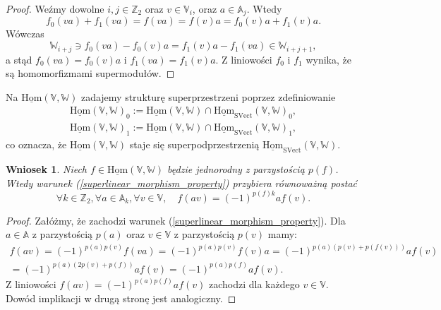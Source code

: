 \documentclass[11pt,a4paper]{report}
\newtheorem{corollary}[theorem]{Wniosek}
\theoremstyle{definition}
\begin{document}
\begin{proof}
	Weźmy dowolne $i,j \in \mathbb{Z}_2$ oraz $v \in \mathbb{V}_i$, oraz $a \in \mathbb{A}_j$. Wtedy
	\begin{equation*}
		f_0 (va) + f_1 (va) = f(va) = f(v)a = f_0(v)a + f_1(v)a.
	\end{equation*}
	Wówczas
	\begin{equation*}
		\mathbb{W}_{i+j} \ni f_0 (va) - f_0(v)a = f_1(v)a - f_1 (va) \in \mathbb{W}_{i+j+1},
	\end{equation*}
	a stąd $f_0 (va)=f_0(v)a$ i $f_1 (va)=f_1(v)a$. Z liniowości $f_0$ i $f_1$ wynika, że są homomorfizmami supermodułów. 
\end{proof}
Na $\underline{\mathrm{Hom}}(\mathbb{V},\mathbb{W})$ zadajemy strukturę superprzestrzeni poprzez zdefiniowanie
\begin{equation*}
	\begin{gathered}
		\underline{\mathrm{Hom}}(\mathbb{V},\mathbb{W})_0 := \underline{\mathrm{Hom}}(\mathbb{V},\mathbb{W}) \cap \underline{\mathrm{Hom}}_{\mathrm{SVect}}(\mathbb{V},\mathbb{W})_0, \\
		\underline{\mathrm{Hom}}(\mathbb{V},\mathbb{W})_1 := \underline{\mathrm{Hom}}(\mathbb{V},\mathbb{W}) \cap \underline{\mathrm{Hom}}_{\mathrm{SVect}}(\mathbb{V},\mathbb{W})_1,
	\end{gathered}
\end{equation*}
co oznacza, że $\underline{\mathrm{Hom}}(\mathbb{V},\mathbb{W})$ staje się superpodprzestrzenią $\underline{\mathrm{Hom}}_{\mathrm{SVect}}(\mathbb{V},\mathbb{W})$. 

\begin{corollary}
	Niech $f \in \underline{\mathrm{Hom}}(\mathbb{V},\mathbb{W})$ będzie jednorodny z parzystością $p(f)$. Wtedy warunek (\ref{superlinear_morphism_property}) przybiera równoważną postać
	\begin{equation}
		\forall k \in \mathbb{Z}_2, \forall a \in \mathbb{A}_k, \forall v \in \mathbb{V}, \quad f(av) = (-1)^{p(f)k} af(v).
	\end{equation}
\end{corollary}
\begin{proof}
	Załóżmy, że zachodzi warunek (\ref{superlinear_morphism_property}). Dla $a \in \mathbb{A}$ z parzystością $p(a)$ oraz $v \in \mathbb{V}$ z parzystością $p(v)$ mamy:
	\begin{equation*}
		\begin{gathered}
			f(av) = (-1)^{p(a)p(v)}f(va) = (-1)^{p(a)p(v)}f(v)a = (-1)^{p(a)(p(v) + p(f(v)))}af(v) \\ 
			= (-1)^{p(a)(2p(v) + p(f))}af(v) = (-1)^{p(a)p(f)} af(v).
		\end{gathered}
	\end{equation*}
	Z liniowości $f(av) = (-1)^{p(a)p(f)} af(v)$ zachodzi dla każdego $v \in \mathbb{V}$. Dowód implikacji w drugą stronę jest analogiczny.
\end{proof}
\end{document}
